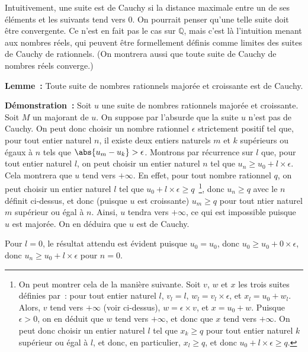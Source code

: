 Intuitivement, une suite est de Cauchy si la distance maximale entre un de ses éléments et les suivants tend vers $0$. 
On pourrait penser qu'une telle suite doit être convergente. 
Ce n'est en fait pas le cas sur $\mathbb{Q}$, mais c'est là l'intuition menant aux nombres réels, qui peuvent être formellement définis comme limites des suites de Cauchy de rationnels. 
(On montrera aussi que toute suite de Cauchy de nombres réels converge.)

\medskip

\noindent\textbf{Lemme :} Toute suite de nombres rationnels majorée et croissante est de Cauchy. 

\medskip

\noindent\textbf{Démonstration :} Soit $u$ une suite de nombres rationnels majorée et croissante. 
    Soit $M$ un majorant de $u$.
    On suppose par l'absurde que la suite $u$ n'est pas de Cauchy. 
    On peut donc choisir un nombre rationnel $\epsilon$ strictement positif tel que, pour tout entier naturel $n$, il existe deux entiers naturels $m$ et $k$ supérieurs ou égaux à $n$ tels que $\abs{u_m - u_k} > \epsilon$. 
    Montrons par récurrence sur $l$ que, pour tout entier naturel $l$, on peut choisir un entier naturel $n$ tel que $u_n \geq u_0 + l \times \epsilon$. 
    Cela montrera que $u$ tend vers $+\infty$. 
    En effet, pour tout nombre rationnel $q$, on peut choisir un entier naturel $l$ tel que $u_0 + l \times \epsilon \geq q$~\footnote{
        On peut montrer cela de la manière suivante. 
        Soit $v$, $w$ et $x$ les trois suites définies par : pour tout entier naturel $l$, $v_l = l$, $w_l = v_l \times \epsilon$, et $x_l = u_0 + w_l$.
        Alors, $v$ tend vers $+\infty$ (voir ci-dessus), $w = \epsilon \times v$, et $x = u_0 + w$.
        Puisque $\epsilon > 0$, on en déduit que $w$ tend vers $+\infty$, et donc que $x$ tend vers $+\infty$. 
        On peut donc choisir un entier naturel $l$ tel que $x_k \geq q$ pour tout entier naturel $k$ supérieur ou égal à $l$, et donc, en particulier, $x_l \geq q$, et donc $u_0 + l \times \epsilon \geq q$.
    }, donc $u_n \geq q$ avec le $n$ définit ci-dessus, et donc (puisque $u$ est croissante) $u_m \geq q$ pour tout ntier naturel $m$ supérieur ou égal à $n$.
    Ainsi, $u$ tendra vers $+\infty$, ce qui est impossible puisque $u$ est majorée.
    On en déduira que $u$ est de Cauchy.

    Pour $l = 0$, le résultat attendu est évident puisque $u_0 = u_0$, donc $u_0 \geq u_0 + 0 \times \epsilon$, donc $u_n \geq u_0 + l \times \epsilon$ pour $n = 0$.

